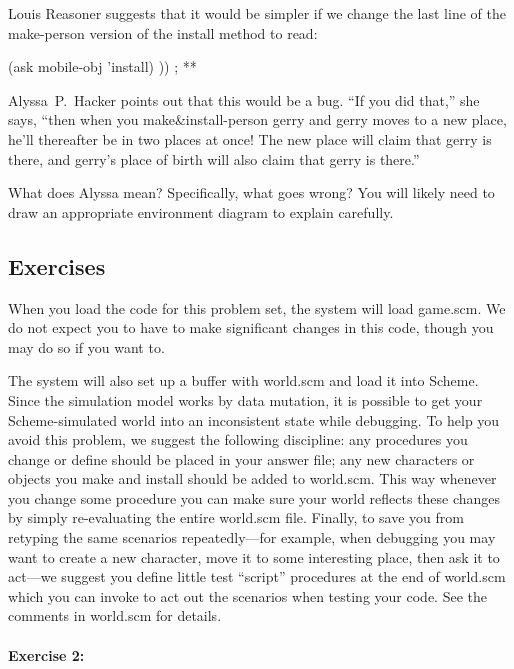 Louis Reasoner suggests that it would be simpler if we change the
last line of the {\cf make-person} version of the {\cf install} method to read:

\beginlisp
               (ask mobile-obj 'install) ))   ; **
\endlisp

Alyssa~P.\ Hacker points out that this would be a bug.  ``If you did
that,'' she says, ``then when you {\cf make\&install-person} {\cf gerry}
and {\cf gerry} moves to a new place, he'll thereafter be in two places
at once!  The new place will claim that {\cf gerry} is there, and {\cf
gerry}'s place of birth will also claim that {\cf gerry} is there.''

What does Alyssa mean?  Specifically, what goes wrong? You will likely
need to draw an appropriate environment diagram to explain carefully.

\subsection{Exercises}

When you load the code for this problem set, the system will load {\cf
game.scm}.  We do not expect you to have to make significant
changes in this code, though you may do so if you want to.

The system will also set up a buffer with {\cf world.scm} and
load it into {\sc Scheme}.  Since the simulation model works by data
mutation, it is possible to get your {\sc Scheme}-simulated world into
an inconsistent state while debugging.  To help you avoid this
problem, we suggest the following discipline: any procedures you
change or define should be placed in your answer file; any new
characters or objects you make and install should be added to {\cf
world.scm}.  This way whenever you change some procedure you can make
sure your world reflects these changes by simply re-evaluating the
entire {\cf world.scm} file.  Finally, to save you from retyping the
same scenarios repeatedly---for example, when debugging you may want
to create a new character, move it to some interesting place, then ask
it to act---we suggest you define little test ``script'' procedures at
the end of {\cf world.scm} which you can invoke to act out the
scenarios when testing your code.  See the comments in {\cf world.scm}
for details.

\paragraph{Exercise 2:}

